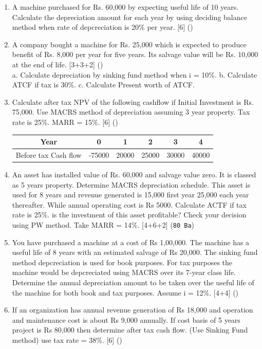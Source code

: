 \documentclass[12pt]{article}
\begin{document}
\begin{enumerate}
			\item A machine purchased for Rs. 60,000 by expecting useful life of 10 years. Calculate the depreciation amount for each year by using deciding balance method when rate of depcreciation is 20\% per year. \hfill [6] ()

			\item A company bought a machine for Rs. 25,000 which is expected to produce benefit of Rs. 8,000 per year for five years. Its salvage value will be Rs. 10,000 at the end of life. \hfill [3+3+2] ()\\
			a. Calculate depreciation by sinking fund method when i = 10\%.
			b. Calculate ATCF if tax is 30\%.
			c. Calculate Present worth of ATCF.

			\item Calculate after tax NPV of the following cashflow if Initial Investment is Rs. 75,000. Use MACRS method of depreciation assuming 3 year property. Tax rate is 25\%. MARR = 15\%. \hfill [6] ()\\
			\begin{tabular}{|c|c|c|c|c|c|}
				\hline
				Year & 0 & 1 & 2 & 3 & 4 \\ \hline
				Before tax Cash flow & -75000 & 20000 & 25000 & 30000 & 40000 \\ \hline
			\end{tabular}

			\item An asset has installed value of Rs. 60,000 and salvage value zero. It is classed as 5 years property. Determine MACRS depreciation schedule. This asset is used for 8 years and revenue generated is 15,000 first year 25,000 each year thereafter. While annual operating cost is Rs 5000. Calculate ACTF if tax rate is 25\%. is the investment of this asset profitable? Check your decision using PW method. Take MARR = 14\%. \hfill [4+6+2] (\texttt{80 Ba})

			\item You have purchased a machine at a cost of Rs 1,00,000. The machine has a useful life of 8 years with an estimated salvage of Rs 20,000. The sinking fund method depcreciation is used for book purposes. For tax purposes the machine would be depcreciated using MACRS over its 7-year class life. Determine the annual depreciation amount to be taken over the useful life of the machine for both book and tax purposes. Assume i = 12\%. \hfill [4+4] ()

			\item If an organization has annual revenue generation of Rs 18,000 and operation and maintenance cost is about Rs 9,000 annually. If cost basis of 5 years project is Rs 80,000 then determine after tax cash flow. (Use Sinking Fund method) use tax rate = 38\%. \hfill [6] ()


\end{enumerate}
\end{document}
